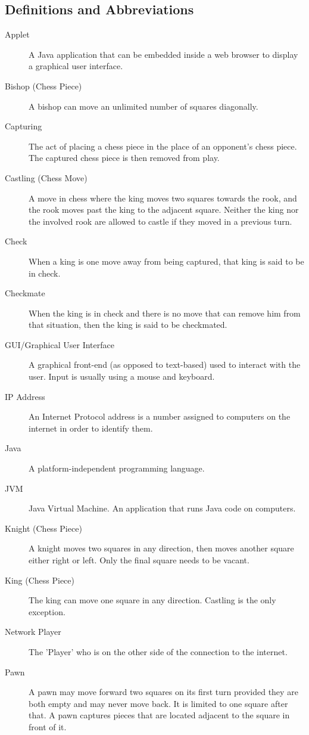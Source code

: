 \subsection{Definitions and Abbreviations}
\begin{description}                                      
\item[Applet] A Java application that can be embedded inside a web browser to display a graphical user interface. 
\item[Bishop (Chess Piece)] A bishop can move an unlimited number of squares diagonally.
\item[Capturing] The act of placing a chess piece in the place of an opponent's chess piece. The captured chess piece is then removed from play.
\item[Castling (Chess Move)] A move in chess where the king moves two squares towards the rook, and the rook moves past the king to the adjacent square. Neither the king nor the involved rook are allowed to castle if they moved in a previous turn.
\item[Check] When a king is one move away from being captured, that king is said to be in check. 
\item[Checkmate] When the king is in check and there is no move that can remove him from that situation, then the king is said to be checkmated.
\item[GUI/Graphical User Interface] A graphical front-end (as opposed to text-based) used to interact with the user. Input is usually using a mouse and keyboard. 
\item[IP Address ] An Internet Protocol address is a number assigned to computers on the internet in order to identify them.
\item[Java] A platform-independent programming language.
\item[JVM] Java Virtual Machine. An application that runs Java code on computers. 
\item[Knight (Chess Piece)] A knight moves two squares in any direction, then moves another square either right or left. Only the final square needs to be vacant.
\item[King (Chess Piece)] The king can move one square in any direction. Castling is the only exception.
\item[Network Player]  The 'Player' who is on the other side of the connection to the internet.
\item[Pawn]  A pawn may move forward two squares on its first turn provided they are both empty and may never move back. It is limited to one square after that. A pawn captures pieces that are located adjacent to the square in front of it. 

\end{description}
